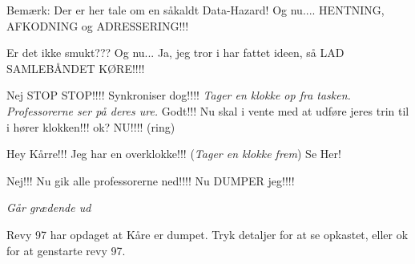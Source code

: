 \documentclass[a4paper,11pt]{article}
\begin{document}
\begin{sketch}
\says{\kvaj} Bemærk: Der er her tale om en såkaldt Data-Hazard! Og nu....
HENTNING, AFKODNING og ADRESSERING!!!

        
\says{\kvaj} Er det ikke smukt??? Og nu... Ja, jeg tror i har fattet
ideen, så LAD SAMLEBÅNDET KØRE!!!!


\says{\kvaj} Nej STOP STOP!!!! Synkroniser dog!!!! \emph{Tager en klokke op
  fra tasken. Professorerne ser på deres ure. } Godt!!! Nu skal i vente med
at udføre jeres trin til i hører klokken!!! ok?  NU!!!! (ring)




\says{\ansv} Hey Kårre!!! Jeg har en overklokke!!! (\emph{Tager en klokke
  frem}) Se Her!


\says{\kvaj} Nej!!! Nu gik alle professorerne ned!!!! Nu DUMPER jeg!!!!

\emph{Går grædende ud}

 Revy 97 har opdaget at Kåre er dumpet. Tryk detaljer for at
se opkastet, eller ok for at genstarte revy 97.
\end{sketch}
\end{document}
